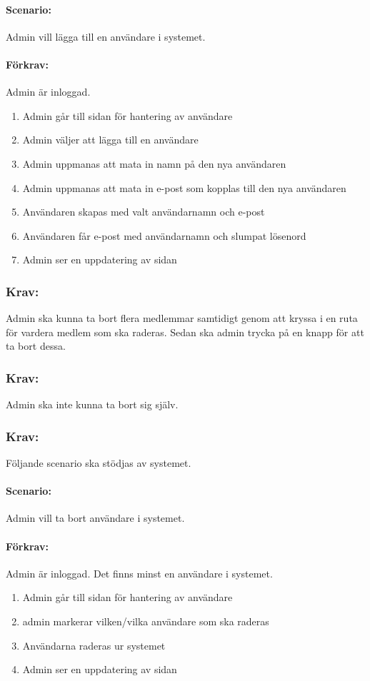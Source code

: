 \documentclass[paper=a4, fontsize=11pt,twoside]{article}
\begin{document}
\paragraph{Scenario:}
Admin vill lägga till en användare i systemet.
\paragraph{Förkrav:}
Admin är inloggad. 
\begin{enumerate}
\item Admin går till sidan för hantering av användare
\item Admin väljer att lägga till en användare
\item Admin uppmanas att mata in namn på den nya användaren
\item Admin uppmanas att mata in e-post som kopplas till den nya användaren
\item Användaren skapas med valt användarnamn och e-post
\item Användaren får e-post med användarnamn och slumpat lösenord
\item Admin ser en uppdatering av sidan
\end{enumerate}

\subsubsection{Krav:} Admin ska kunna ta bort flera medlemmar samtidigt genom att kryssa i en ruta för vardera medlem som ska raderas. Sedan ska admin trycka på en knapp för att ta bort dessa.

\subsubsection{Krav:} Admin ska inte kunna ta bort sig själv.

\subsubsection{Krav:} Följande scenario ska stödjas av systemet. 
\paragraph{Scenario:}
Admin vill ta bort användare i systemet.
\paragraph{Förkrav:}
Admin är inloggad. Det finns minst en användare i systemet.
\begin{enumerate}
\item Admin går till sidan för hantering av användare
\item admin markerar vilken/vilka användare som ska raderas
\item Användarna raderas ur systemet
\item Admin ser en uppdatering av sidan
\end{enumerate}
\end{document}
